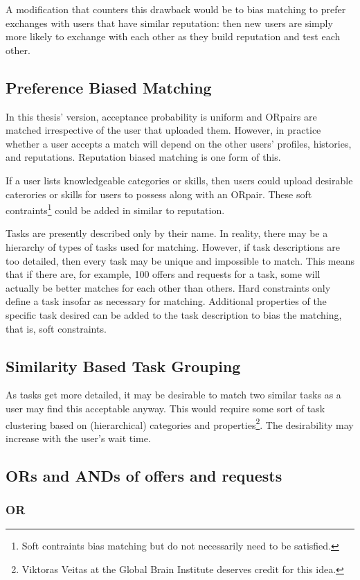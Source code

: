 \documentclass[main.tex]{subfiles}
\begin{document}
A modification that counters this drawback would be to bias matching to prefer exchanges with users that have similar reputation: then new users are simply more likely to exchange with each other as they build reputation and test each other.

\subsection{Preference Biased Matching}
In this thesis' version, acceptance probability is uniform and ORpairs are matched irrespective of the user that uploaded them. However, in practice whether a user accepts a match will depend on the other users' profiles, histories, and reputations. Reputation biased matching is one form of this.

If a user lists knowledgeable categories or skills, then users could upload desirable caterories or skills for users to possess along with an ORpair. These soft contraints\footnote{Soft contraints bias matching but do not necessarily need to be satisfied.} could be added in similar to reputation.

Tasks are presently described only by their name. In reality, there may be a hierarchy of types of tasks used for matching. However, if task descriptions are too detailed, then every task may be unique and impossible to match. This means that if there are, for example, 100 offers and requests for a task, some will actually be better matches for each other than others. Hard constraints only define a task insofar as necessary for matching. Additional properties of the specific task desired can be added to the task description to bias the matching, that is, soft constraints.

\subsection{Similarity Based Task Grouping}
As tasks get more detailed, it may be desirable to match two similar tasks as a user may find this acceptable anyway. This would require some sort of task clustering based on (hierarchical) categories and properties\footnote{Viktoras Veitas at the Global Brain Institute deserves credit for this idea.}. The desirability may increase with the user's wait time.

\subsection{ORs and ANDs of offers and requests}
\subsubsection{OR}
\end{document}
